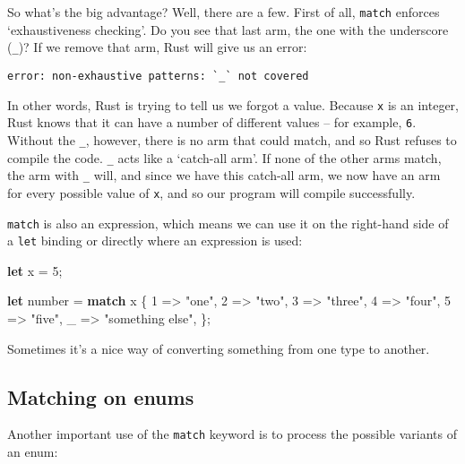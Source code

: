 \documentclass[a4paper,]{book}
\newenvironment{Shaded}{\begin{snugshade}}{\end{snugshade}}
\newcommand{\KeywordTok}[1]{\textcolor[rgb]{0.13,0.29,0.53}{\textbf{{#1}}}}
\newcommand{\DecValTok}[1]{\textcolor[rgb]{0.00,0.00,0.81}{{#1}}}
\newcommand{\StringTok}[1]{\textcolor[rgb]{0.31,0.60,0.02}{{#1}}}
\newcommand{\NormalTok}[1]{{#1}}
\begin{document}
So what's the big advantage? Well, there are a few. First of all,
\texttt{match} enforces `exhaustiveness checking'. Do you see that last
arm, the one with the underscore (\texttt{\_})? If we remove that arm,
Rust will give us an error:

\begin{verbatim}
error: non-exhaustive patterns: `_` not covered
\end{verbatim}

In other words, Rust is trying to tell us we forgot a value. Because
\texttt{x} is an integer, Rust knows that it can have a number of
different values -- for example, \texttt{6}. Without the \texttt{\_},
however, there is no arm that could match, and so Rust refuses to
compile the code. \texttt{\_} acts like a `catch-all arm'. If none of
the other arms match, the arm with \texttt{\_} will, and since we have
this catch-all arm, we now have an arm for every possible value of
\texttt{x}, and so our program will compile successfully.

\texttt{match} is also an expression, which means we can use it on the
right-hand side of a \texttt{let} binding or directly where an
expression is used:

\begin{Shaded}
\begin{Highlighting}[]
\KeywordTok{let} \NormalTok{x = }\DecValTok{5}\NormalTok{;}

\KeywordTok{let} \NormalTok{number = }\KeywordTok{match} \NormalTok{x \{}
    \DecValTok{1} \NormalTok{=> }\StringTok{"one"}\NormalTok{,}
    \DecValTok{2} \NormalTok{=> }\StringTok{"two"}\NormalTok{,}
    \DecValTok{3} \NormalTok{=> }\StringTok{"three"}\NormalTok{,}
    \DecValTok{4} \NormalTok{=> }\StringTok{"four"}\NormalTok{,}
    \DecValTok{5} \NormalTok{=> }\StringTok{"five"}\NormalTok{,}
    \NormalTok{_ => }\StringTok{"something else"}\NormalTok{,}
\NormalTok{\};}
\end{Highlighting}
\end{Shaded}

Sometimes it's a nice way of converting something from one type to
another.

\subsection{Matching on enums}\label{matching-on-enums}

Another important use of the \texttt{match} keyword is to process the
possible variants of an enum:
\end{document}
